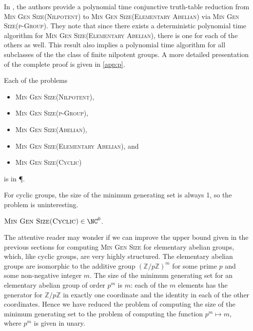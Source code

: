 \documentclass{article}
\begin{document}

In \cite{at06}, the authors provide a polynomial time conjunctive truth-table reduction from \textsc{Min Gen Size(Nilpotent)} to \textsc{Min Gen Size(Elementary Abelian)} via \textsc{Min Gen Size(p-Group)}.
They note that since there exists a deterministic polynomial time algorithm for \textsc{Min Gen Size(Elementary Abelian)}, there is one for each of the others as well.
This result also implies a polynomial time algorithm for all subclasses of the the class of finite nilpotent groups.
A more detailed presentation of the complete proof is given in \autoref{app:p}.

\begin{theorem}[{\cite[Theorem~7]{at06}}]
  Each of the problems
  \begin{itemize}
  \item \textsc{Min Gen Size(Nilpotent)},
  \item \textsc{Min Gen Size(p-Group)},
  \item \textsc{Min Gen Size(Abelian)},
  \item \textsc{Min Gen Size(Elementary Abelian)}, and
  \item \textsc{Min Gen Size(Cyclic)}
  \end{itemize}
  is in \P.
\end{theorem}

For cyclic groups, the size of the minimum generating set is always 1, so the problem is uninteresting.

\begin{theorem}
  $\textsc{Min Gen Size(Cyclic)} \in \NC^0$.
\end{theorem}

The attentive reader may wonder if we can improve the upper bound given in the previous sections for computing \textsc{Min Gen Size} for elementary abelian groups, which, like cyclic groups, are very highly structured.
The elementary abelian groups are isomorphic to the additive group $(\mathbb{Z}/p\mathbb{Z})^m$ for some prime $p$ and some non-negative integer $m$.
The size of the minimum generating set for an elementary abelian group of order $p^m$ is $m$: each of the $m$ elements has the generator for $\mathbb{Z}/p\mathbb{Z}$ in exactly one coordinate and the identity in each of the other coordinates.
Hence we have reduced the problem of computing the size of the minimum generating set to the problem of computing the function $p^m \mapsto m$, where $p^m$ is given in unary.
\end{document}
